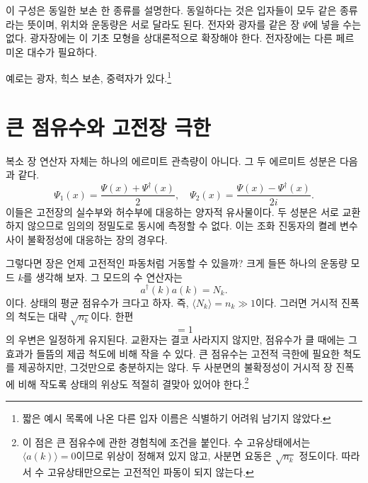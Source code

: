 이 구성은 동일한 보손 한 종류를 설명한다. 동일하다는 것은 입자들이 모두 같은 종류라는 뜻이며, 위치와 운동량은 서로 달라도 된다. 전자와 광자를 같은 장 \(\Psi\)에 넣을 수는 없다. 광자장에는 이 기초 모형을 상대론적으로 확장해야 한다. 전자장에는 다른 페르미온 대수가 필요하다.

\begin{classroomqa}\end{classroomqa}


예로는 광자, 힉스 보손, 중력자가 있다.\footnote{짧은 예시 목록에 나온 다른 입자 이름은 식별하기 어려워 남기지 않았다.}

\section{큰 점유수와 고전장 극한}

복소 장 연산자 자체는 하나의 에르미트 관측량이 아니다. 그 두 에르미트 성분은 다음과 같다.
\begin{equation}
\Psi_1(x)=\frac{\Psi(x)+\Psi^\dagger(x)}{2},
\quad
\Psi_2(x)=\frac{\Psi(x)-\Psi^\dagger(x)}{2i}.
\end{equation}
이들은 고전장의 실수부와 허수부에 대응하는 양자적 유사물이다. 두 성분은 서로 교환하지 않으므로 임의의 정밀도로 동시에 측정할 수 없다. 이는 조화 진동자의 켤레 변수 사이 불확정성에 대응하는 장의 경우다.

그렇다면 장은 언제 고전적인 파동처럼 거동할 수 있을까? 크게 들뜬 하나의 운동량 모드 \(k\)를 생각해 보자. 그 모드의 수 연산자는
\begin{equation}
a^\dagger(k)a(k)=N_k.
\end{equation}
이다. 상태의 평균 점유수가 크다고 하자. 즉, \(\langle N_k\rangle=n_k\gg 1\)이다. 그러면 거시적 진폭의 척도는 대략 \(\sqrt{n_k}\)이다. 한편
\begin{equation}
[a(k),a^\dagger(k)]=1
\end{equation}
의 우변은 일정하게 유지된다. 교환자는 결코 사라지지 않지만, 점유수가 클 때에는 그 효과가 들뜸의 제곱 척도에 비해 작을 수 있다. 큰 점유수는 고전적 극한에 필요한 척도를 제공하지만, 그것만으로 충분하지는 않다. 두 사분면의 불확정성이 거시적 장 진폭에 비해 작도록 상태의 위상도 적절히 결맞아 있어야 한다.\footnote{이 점은 큰 점유수에 관한 경험칙에 조건을 붙인다. 수 고유상태에서는 \(\langle a(k)\rangle=0\)이므로 위상이 정해져 있지 않고, 사분면 요동은 \(\sqrt{n_k}\) 정도이다. 따라서 수 고유상태만으로는 고전적인 파동이 되지 않는다.}

